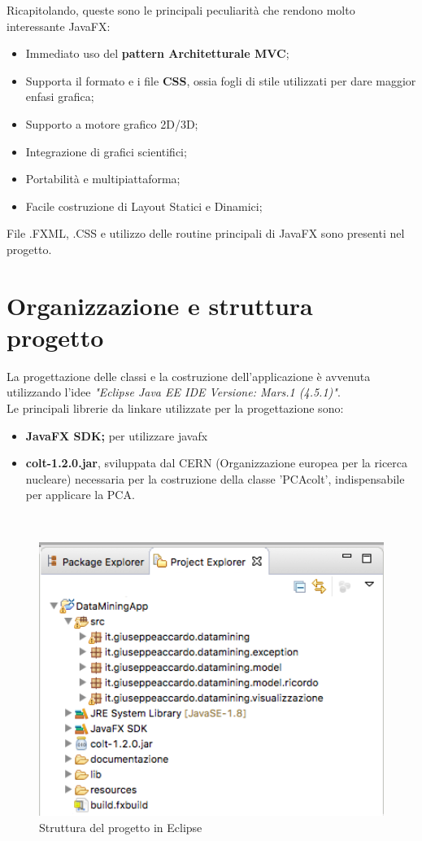 \documentclass[a4paper, oneside]{book}
\begin{document}
Ricapitolando, queste sono le principali peculiarità che rendono molto interessante JavaFX:
     \begin{itemize}
        \item{Immediato uso del \textbf{pattern Architetturale MVC};}
        \item{Supporta il formato e i file \textbf{CSS}, ossia fogli di stile utilizzati per dare maggior enfasi grafica;}
        \item{Supporto a motore grafico 2D/3D;}
        \item{Integrazione di grafici scientifici;}
        \item{Portabilità e multipiattaforma;}
        \item{Facile costruzione di Layout Statici e Dinamici;}
      \end{itemize}
File .FXML, .CSS e utilizzo delle routine principali di JavaFX sono presenti nel progetto.



\newpage
\large
\section*{Organizzazione e struttura progetto}
La progettazione delle classi e la costruzione dell'applicazione è avvenuta utilizzando l'idee \textit{"Eclipse Java EE IDE Versione: Mars.1 (4.5.1)"}.\\
Le principali librerie da linkare utilizzate per la progettazione sono:
     \begin{itemize}
        \item{\textbf{JavaFX SDK;} per utilizzare javafx}
        \item{\textbf{colt-1.2.0.jar}, sviluppata dal CERN (Organizzazione europea per la ricerca nucleare) necessaria per la costruzione della classe 'PCAcolt', indispensabile per applicare la PCA.}
      \end{itemize}

\\
\begin{figure}[htp]
\centering
\includegraphics[width=13cm]{struttura.png}
\caption{Struttura del progetto in Eclipse}
\label{fig:Struttura elcipse}
\end{figure}
\end{document}
